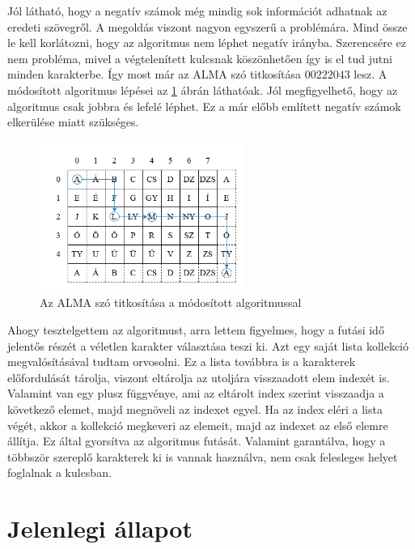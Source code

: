 \documentclass[12pt]{report} %
\begin{document}
Jól látható, hogy a negatív számok még mindig sok információt adhatnak az eredeti szövegről. A megoldás viszont nagyon egyszerű a problémára. Mind össze le kell korlátozni, hogy az algoritmus nem léphet negatív irányba. Szerencsére ez nem probléma, mivel a végtelenített kulcsnak köszönhetően így is el tud jutni minden karakterbe. Így most már az ALMA szó titkosítása $00222043$ lesz. A módosított algoritmus lépései az \ref{fig:MyAlgorithm3} ábrán láthatóak. Jól megfigyelhető, hogy az algoritmus csak jobbra és lefelé léphet. Ez a már előbb említett negatív számok elkerülése miatt szükséges.

\begin{figure}[H]
    \centering %
    \includegraphics[width=0.6\textwidth]{Figures/MyAlgorithm3.png} %
    \caption{Az ALMA szó titkosítása a módosított algoritmussal} %
    \label{fig:MyAlgorithm3} %
\end{figure}

Ahogy tesztelgettem az algoritmust, arra lettem figyelmes, hogy a futási idő jelentős részét a véletlen karakter választása teszi ki. Azt egy saját lista kollekció megvalósításával tudtam orvosolni. Ez a lista továbbra is a karakterek előfordulását tárolja, viszont eltárolja az utoljára visszaadott elem indexét is. Valamint van egy plusz függvénye, ami az eltárolt index szerint visszaadja a következő elemet, majd megnöveli az indexet egyel. Ha az index eléri a lista végét, akkor a kollekció megkeveri az elemeit, majd az indexet az első elemre állítja. Ez által gyorsítva az algoritmus futását. Valamint garantálva, hogy a többször szereplő karakterek ki is vannak használva, nem csak felesleges helyet foglalnak a kulcsban.

\section{Jelenlegi állapot} %
\end{document}

